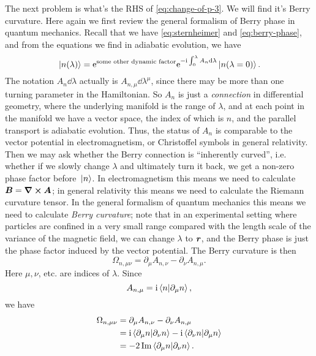 \documentclass[hyperref, a4paper]{article}
\newcommand*{\ii}{\mathrm{i}}
\newcommand*{\ee}{\mathrm{e}}
\begin{document}
The next problem is what's the RHS of \eqref{eq:change-of-p-3}.
We will find it's Berry curvature. 
Here again we first review the general formalism of Berry phase in quantum mechanics.
Recall that we have \eqref{eq:sternheimer} and \eqref{eq:berry-phase}, 
and from the equations we find in adiabatic evolution, 
we have 
\begin{equation}
    \ket*{n(\lambda)} = \ee^{\text{some other dynamic factor}} \ee^{- \ii \int_{0}^{\lambda} A_n \dd{\lambda} } \ket*{n(\lambda = 0)}.
\end{equation}
The notation $A_n \dd{\lambda}$ actually is 
$A_{n, \mu} \dd{\lambda^\mu}$, 
since there may be more than one turning parameter in the Hamiltonian.
So $A_n$ is just a \emph{connection} in differential geometry,
where the underlying manifold is the range of $\lambda$,
and at each point in the manifold we have a vector space,
the index of which is $n$,
and the parallel transport is adiabatic evolution.
Thus, the status of $A_n$ is comparable to 
the vector potential in electromagnetism,
or Christoffel symbols in general relativity.
Then we may ask whether the Berry connection is ``inherently curved'',
i.e. whether if we slowly change $\lambda$ 
and ultimately turn it back, 
we get a non-zero phase factor before $\ket*{n}$.
In electromagnetism this means we need to calculate $\vb*{B} = \curl{\vb*{A}}$;
in general relativity this means we need to calculate the Riemann curvature tensor. 
In the general formalism of quantum mechanics 
this means we need to calculate \emph{Berry curvature};
note that in an experimental setting 
where particles are confined in a very small range compared with 
the length scale of the variance of the magnetic field, 
we can change $\lambda$ to $\vb*{r}$,
and the Berry phase is just the phase factor induced by the vector potential.
The Berry curvature is then 
\begin{equation}
    \Omega_{n, \mu \nu} = \partial_{\mu} A_{n, \nu} - \partial_{\nu} A_{n, \mu}.
\end{equation}
Here $\mu, \nu$, etc. are indices of $\lambda$.
Since 
\begin{equation}
    A_{n, \mu} = \ii \braket{n}{\partial_\mu n}, 
\end{equation}
we have 
\begin{equation}
    \begin{aligned}
        \Omega_{n, \mu \nu} &= \partial_{\mu} A_{n, \nu} - \partial_{\nu} A_{n, \mu} \\
        &= \ii \braket{\partial_{\mu} n}{\partial_{\nu} n}
        - \ii \braket{\partial_{\nu} n}{\partial_{\mu} n} \\
        &= - 2 \Im \braket{\partial_{\mu} n}{\partial_{\nu} n}.
    \end{aligned}
\end{equation}
\end{document}
